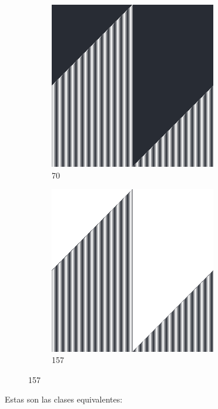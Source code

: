 \documentclass[12pt, fleqn]{report}                             %
\theoremstyle{break}                                            %
\begin{document}
\begin{figure}[h!]
\begin{subfigure}[b]{0.4\linewidth}
          \includegraphics[width=0.8\textwidth]{Images/70/a.png}
          \caption{70}
        \end{subfigure}
        \begin{subfigure}[b]{0.4\linewidth}
          \includegraphics[width=0.8\textwidth]{Images/157/a.png}
          \caption{157}
        \end{subfigure}
      \end{figure}


      \clearpage
      Estas son las clases equivalentes:
\end{document}
